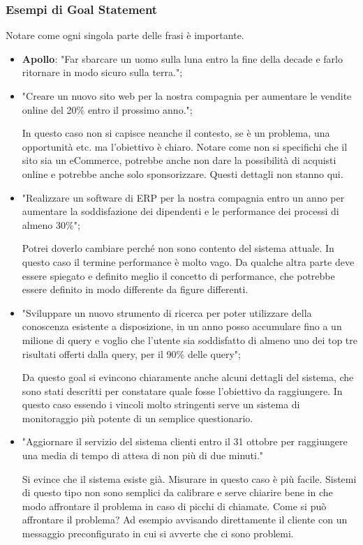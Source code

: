 \subsubsection{Esempi di Goal Statement}
Notare come ogni singola parte delle frasi è importante.
\begin{itemize}
	\item \textbf{Apollo}: "Far sbarcare un uomo sulla luna entro la fine della decade e farlo ritornare in modo sicuro sulla terra.";
	\item "Creare un nuovo sito web per la nostra compagnia per aumentare le vendite online del 20\% entro il prossimo anno.";
	\begin{info}
		In questo caso non si capisce neanche il contesto, se è un problema, una opportunità etc. ma l'obiettivo è chiaro. Notare come non si specifichi che il sito sia un eCommerce, potrebbe anche non dare la possibilità di acquisti online e potrebbe anche solo sponsorizzare. Questi dettagli non stanno qui.
	\end{info}
	\item "Realizzare un software di ERP per la nostra compagnia entro un anno per aumentare la soddisfazione dei dipendenti e le performance dei processi di almeno 30\%";
	\begin{info}
		Potrei doverlo cambiare perché non sono contento del sistema attuale. In questo caso il termine performance è molto vago. Da qualche altra parte deve essere spiegato e definito meglio il concetto di performance, che potrebbe essere definito in modo differente da figure differenti.
	\end{info}
	\item "Sviluppare un nuovo strumento di ricerca per poter utilizzare della conoscenza esistente a disposizione, in un anno posso accumulare fino a un milione di query e voglio che l'utente sia soddisfatto di almeno uno dei top tre risultati offerti dalla query, per il 90\% delle query";
	\begin{info}
		Da questo goal si evincono chiaramente anche alcuni dettagli del sistema, che sono stati descritti per constatare quale fosse l'obiettivo da raggiungere. In questo caso essendo i vincoli molto stringenti serve un sistema di monitoraggio più potente di un semplice questionario.
	\end{info}
	\item "Aggiornare il servizio del sistema clienti entro il 31 ottobre per raggiungere una media di tempo di attesa di non più di due minuti."
		\begin{info}
		Si evince che il sistema esiste già. Misurare in questo caso è più facile. Sistemi di questo tipo non sono semplici da calibrare e serve chiarire bene in che modo affrontare il problema in caso di picchi di chiamate. Come si può affrontare il problema? Ad esempio avvisando direttamente il cliente con un messaggio preconfigurato in cui si avverte che ci sono problemi.
	\end{info}
\end{itemize}

